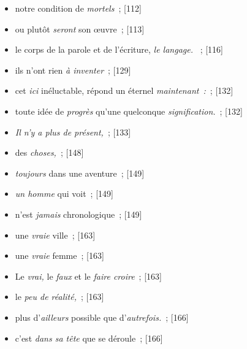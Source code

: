 \documentclass[12pt, a4paper]{article}
\begin{document}
\begin{itemize}
    \item notre condition de \textit{mortels}{\color{gray}~; [112]}

    \item ou plutôt \textit{seront} son œuvre{\color{gray}~; [113]}

    \item le corps de la parole et de l’écriture, \textit{le langage. }{\color{gray}~; [116]}

    \item ils n’ont rien \textit{à inventer}{\color{gray}~; [129]}

    \item cet \textit{ici} inéluctable, répond un éternel \textit{maintenant~:}{\color{gray}~; [132]}

    \item toute idée de \textit{progrès} qu’une quelconque \textit{signification.}{\color{gray}~; [132]}

    \item \textit{Il n’y a plus de présent,}{\color{gray}~; [133]}

    \item des \textit{choses,}{\color{gray}~; [148]}

    \item \textit{toujours} dans une aventure{\color{gray}~; [149]}

    \item \textit{un homme} qui voit{\color{gray}~; [149]}

    \item n’est \textit{jamais} chronologique{\color{gray}~; [149]}

    \item une \textit{vraie} ville{\color{gray}~; [163]}

    \item une \textit{vraie} femme{\color{gray}~; [163]}

    \item  Le \textit{vrai,} le \textit{faux} et le \textit{faire croire}{\color{gray}~; [163]}

    \item le \textit{peu de réalité,}{\color{gray}~; [163]}

    \item plus d’\textit{ailleurs} possible que d’\textit{autrefois.}{\color{gray}~; [166]}

    \item c’est \textit{dans sa tête} que se déroule{\color{gray}~; [166]}


\end{itemize}
\end{document}
